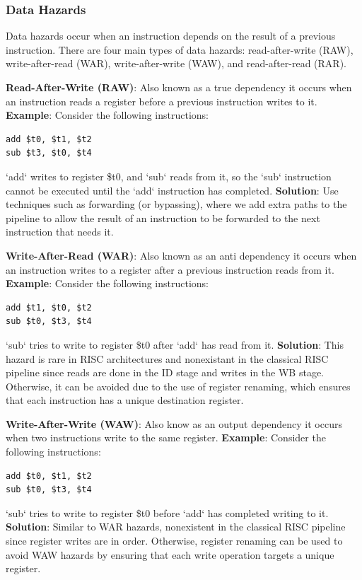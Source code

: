 \subsubsection {Data Hazards}\label{sec:data_hazards}
Data hazards occur when an instruction depends on the result of a previous instruction. There are four main types of data hazards: read-after-write (RAW), write-after-read (WAR), write-after-write (WAW), and read-after-read (RAR).

\textbf{Read-After-Write (RAW)}: Also known as a true dependency it occurs when an instruction reads a register before a previous instruction writes to it.\newline
\textbf{Example}: Consider the following instructions:
\begin{verbatim}
add $t0, $t1, $t2
sub $t3, $t0, $t4   
\end{verbatim}
`add` writes to register \$t0, and `sub` reads from it, so the `sub` instruction cannot be executed until the `add` instruction has completed.\newline
\textbf{Solution}: Use techniques such as forwarding (or bypassing), where we add extra paths to the pipeline to allow the result of an instruction to be forwarded to the next instruction that needs it.

\textbf{Write-After-Read (WAR)}: Also known as an anti dependency it occurs when an instruction writes to a register after a previous instruction reads from it.\newline
\textbf{Example}: Consider the following instructions:
\begin{verbatim}
add $t1, $t0, $t2
sub $t0, $t3, $t4
\end{verbatim}
`sub` tries to write to register \$t0 after `add` has read from it.
\textbf{Solution}: This hazard is rare in RISC architectures and nonexistant in the classical RISC pipeline since reads are done in the ID stage and writes in the WB stage. Otherwise, it can be avoided due to the use of register renaming, which ensures that each instruction has a unique destination register. 

\textbf{Write-After-Write (WAW)}: Also know as an output dependency it occurs when two instructions write to the same register.\newline
\textbf{Example}: Consider the following instructions:
\begin{verbatim}
add $t0, $t1, $t2
sub $t0, $t3, $t4
\end{verbatim}
`sub` tries to write to register \$t0 before `add` has completed writing to it.\newline
\textbf{Solution}: Similar to WAR hazards, nonexistent in the classical RISC pipeline since register writes are in order. Otherwise, register renaming can be used to avoid WAW hazards by ensuring that each write operation targets a unique register.

